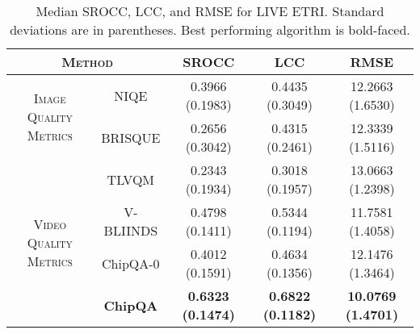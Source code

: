\documentclass[journal]{IEEEtran}
\begin{document}
\begin{table*}
\caption{Median SROCC, LCC, and RMSE for LIVE ETRI. Standard deviations are in parentheses. Best performing algorithm is bold-faced.}
\begin{center}
\begin{tabular}{|c|c|c|c|c|}
\hline
\multicolumn{2}{|c|}{\textsc{Method}}  &  SROCC & LCC & RMSE  \\  
\hline
\multirow{2}{*}{\textsc{Image Quality Metrics}} & NIQE\cite{niqe} & 0.3966 \scriptsize(0.1983) & 0.4435 \scriptsize(0.3049) & 12.2663 \scriptsize(1.6530) \\
\cline{2-5}
& BRISQUE\cite{brisque} &  0.2656 \scriptsize(0.3042) & 0.4315 \scriptsize(0.2461) & 12.3339 \scriptsize(1.5116)   \\
\hline
\multirow{4}{*}{\textsc{Video Quality Metrics}} & TLVQM\cite{tlvqm} &  0.2343 \scriptsize(0.1934) & 0.3018 \scriptsize(0.1957) & 13.0663 \scriptsize(1.2398)\\
\cline{2-5}
& V-BLIINDS\cite{vbliinds} & 0.4798 \scriptsize(0.1411) & 0.5344 \scriptsize(0.1194) & 11.7581 \scriptsize(1.4058) \\
\cline{2-5}
& ChipQA-0\cite{chipqa0} & 0.4012 \scriptsize(0.1591) & 0.4634 \scriptsize(0.1356) & 12.1476 \scriptsize(1.3464) \\
\cline{2-5}
& \textbf{ChipQA} & \textbf{0.6323 \scriptsize(0.1474)} & \textbf{0.6822 \scriptsize(0.1182)} & \textbf{10.0769 \scriptsize(1.4701)} \\
\hline
\end{tabular}
\label{tab:etri}
\end{center}
\vspace{-5mm}
\end{table*}
\end{document}
